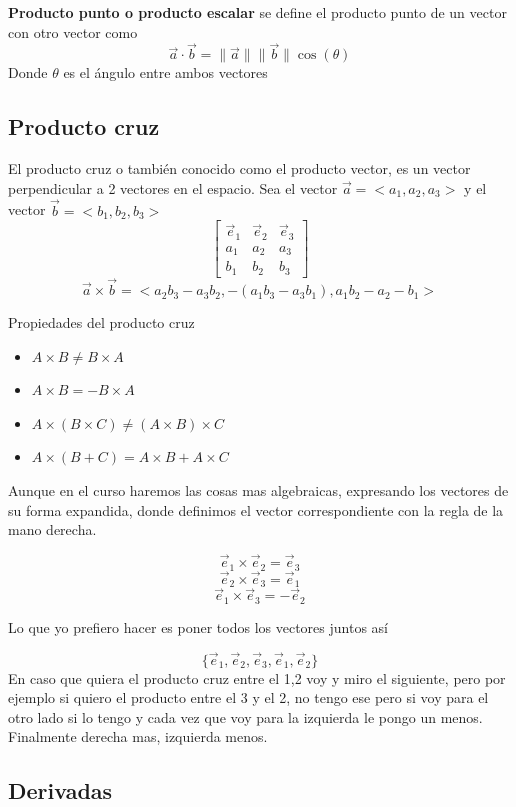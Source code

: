 \textbf{Producto punto o producto escalar}
se define el producto punto de un vector con otro vector como $$\Vec{a}\cdot\Vec{b}=\|\Vec{a}\|\|\Vec{b}\|\cos{(\theta)}$$
Donde $\theta$ es el ángulo entre ambos vectores


\subsection{Producto cruz}
El producto cruz o también conocido como el producto vector, es un vector perpendicular a 2 vectores en el espacio.
Sea el vector $\vec{a}=<a_1 , a_2 , a_3>$ y el vector $\vec{b}=<b_1 , b_2 , b_3>$
\begin{equation}
\begin{bmatrix}
\Vec{e}_1 & \Vec{e}_2 & \Vec{e}_3\\
a_1 & a_2 & a_3\\
b_1 & b_2 & b_3
\end{bmatrix}
\end{equation}
$$\vec{a}\times \vec{b}= <a_2b_3-a_3b_2,-(a_1b_3-a_3b_1), a_1b_2-a_2-b_1>$$

Propiedades del producto cruz
\begin{itemize}
    \item [No es Conmutativo]{$A\times B\neq B\times A$}
    \item[Es anti conmutativo]{$A\times B=-B\times A$}
    \item[No es asociativo]{$A\times (B\times C)\neq (A\times B)\times C$}
    \item[Es distributivo]{$A\times (B+ C)=A\times B+A\times C$}
\end{itemize}


Aunque en el curso haremos las cosas mas algebraicas, expresando los vectores de su forma expandida, donde definimos el vector correspondiente con la regla de la mano derecha.

$$\Vec{e}_1\times \Vec{e}_2=\Vec{e}_3$$
$$\Vec{e}_2\times \Vec{e}_3=\Vec{e}_1$$
$$\Vec{e}_1\times \Vec{e}_3=-\Vec{e}_2$$

Lo que yo prefiero hacer es poner todos los vectores juntos así

$$\{\Vec{e}_1,\Vec{e}_2,\Vec{e}_3,\Vec{e}_1,\Vec{e}_2\}$$
En caso que quiera el producto cruz entre el 1,2 voy y miro el siguiente, pero por ejemplo si quiero el producto entre el 3 y el 2, no tengo ese pero si voy para el otro lado si lo tengo y cada vez que voy para la izquierda le pongo un menos. Finalmente derecha mas, izquierda menos.


\subsection{Derivadas}

